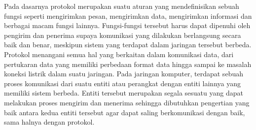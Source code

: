 Pada dasarnya protokol merupakan suatu aturan yang mendefinisikan sebuah fungsi seperti mengirimkan pesan, mengirimkan data, mengirimkan informasi dan berbagai macam fungsi lainnya. Fungsi-fungsi tersebut harus dapat dipenuhi oleh pengirim dan penerima supaya komunikasi yang dilakukan berlangsung secara baik dan benar, meskipun sistem yang terdapat dalam jaringan tersebut berbeda. Protokol menangani semua hal yang berkaitan dalam komunikasi data, dari pertukaran data yang memiliki perbedaan format data hingga sampai ke masalah koneksi listrik dalam suatu jaringan. Pada jaringan komputer, terdapat sebuah proses komunikasi dari suatu entiti atau perangkat dengan entiti lainnya yang memiliki sistem berbeda. Entiti tersebut merupakan segala sesuatu yang dapat melakukan proses mengirim dan menerima sehingga dibutuhkan pengertian yang baik antara kedua entiti tersebut agar dapat saling berkomunikasi dengan baik, sama halnya dengan protokol.

